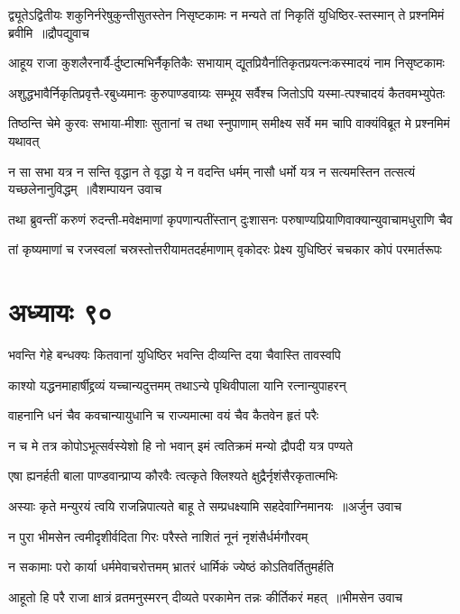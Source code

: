 \threelineshloka
{द्व्यूतेऽद्वितीयः शकुनिर्नरेषुकुन्तीसुतस्तेन निसृष्टकामः}
{न मन्यते तां निकृतिं युधिष्ठिर-स्तस्मान् ते प्रश्नमिमं ब्रवीमि ॥द्रौपद्युवाच}
{}


\twolineshloka
{आहूय राजा कुशलैरनार्यै-र्दुष्टात्मभिर्नैकृतिकैः सभायाम्}
{द्यूतप्रियैर्नातिकृतप्रयत्नःकस्मादयं नाम निसृष्टकामः}


\twolineshloka
{अशुद्धभावैर्निकृतिप्रवृत्तै-रबुध्यमानः कुरुपाण्डवाग्र्यः}
{सम्भूय सर्वैश्च जितोऽपि यस्मा-त्पश्चादयं कैतवमभ्युपेतः}


\twolineshloka
{तिष्ठन्ति चेमे कुरवः सभाया-मीशाः सुतानां च तथा स्नुपाणाम्}
{समीक्ष्य सर्वे मम चापि वाक्यंविब्रूत मे प्रश्नमिमं यथावत्}


\twolineshloka
{न सा सभा यत्र न सन्ति वृद्धान ते वृद्धा ये न वदन्ति धर्मम्}
{नासौ धर्मो यत्र न सत्यमस्तिन तत्सत्यं यच्छलेनानुविद्धम् ॥वैशम्पायन उवाच}


\twolineshloka
{तथा ब्रुवन्तीं करुणं रुदन्ती-मवेक्षमाणां कृपणान्पतींस्तान्}
{दुःशासनः परुषाण्यप्रियाणिवाक्यान्युवाचामधुराणि चैव}


\twolineshloka
{तां कृष्यमाणां च रजस्वलां चस्रस्तोत्तरीयामतदर्हमाणाम्}
{वृकोदरः प्रेक्ष्य युधिष्ठिरं चचकार कोपं परमार्तरूपः}


\chapter{अध्यायः ९०}
\twolineshloka
{भवन्ति गेहे बन्धक्यः कितवानां युधिष्ठिर}
{भवन्ति दीव्यन्ति दया चैवास्ति तावस्वपि}


\twolineshloka
{काश्यो यद्धनमाहार्षीद्द्रव्यं यच्चान्यदुत्तमम्}
{तथाऽन्ये पृथिवीपाला यानि रत्नान्युपाहरन्}


\twolineshloka
{वाहनानि धनं चैव कवचान्यायुधानि च}
{राज्यमात्मा वयं चैव कैतवेन हृतं परैः}


\twolineshloka
{न च मे तत्र कोपोऽभूत्सर्वस्येशो हि नो भवान्}
{इमं त्वतिक्रमं मन्यो द्रौपदी यत्र पण्यते}


\twolineshloka
{एषा ह्यनर्हती बाला पाण्डवान्प्राप्य कौरवैः}
{त्वत्कृते क्लिश्यते क्षुद्रैर्नृशंसैरकृतात्मभिः}


\threelineshloka
{अस्याः कृते मन्युरयं त्वयि राजन्निपात्यते}
{बाहू ते सम्प्रधक्ष्यामि सहदेवाग्निमानयः ॥अर्जुन उवाच}
{}


\twolineshloka
{न पुरा भीमसेन त्वमीदृशीर्वदिता गिरः}
{परैस्ते नाशितं नूनं नृशंसैर्धर्मगौरवम्}


\twolineshloka
{न सकामाः परो कार्या धर्ममेवाचरोत्तमम्}
{भ्रातरं धार्मिकं ज्येष्ठं कोऽतिवर्तितुमर्हति}


\twolineshloka
{आहूतो हि परै राजा क्षात्रं व्रतमनुस्मरन्}
{दीव्यते परकामेन तन्नः कीर्तिकरं महत् ॥भीमसेन उवाच}


